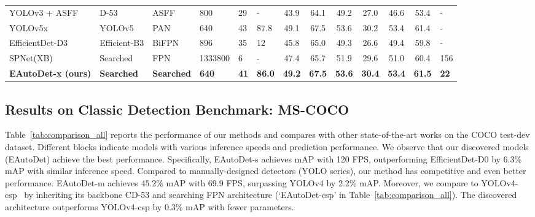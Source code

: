 \documentclass[letterpaper]{article} \usepackage{aaai22}  \usepackage{times}  \usepackage{helvet}  \usepackage{courier}  \usepackage[hyphens]{url}  \usepackage{graphicx} \urlstyle{rm} \def\UrlFont{\rm}  \usepackage{natbib}  \usepackage{caption} \DeclareCaptionStyle{ruled}{labelfont=normalfont,labelsep=colon,strut=off} \frenchspacing  \setlength{\pdfpagewidth}{8.5in}  \setlength{\pdfpageheight}{11in}
\begin{document}
\begin{table*}[tb!]
{\begin{tabular}{llllll c c c c c c l}
\midrule
YOLOv3 + ASFF~\citeyearpar{liu2019learning}  & D-53  & ASFF    & 800 & 29 & - & 43.9 & 64.1 & 49.2 & 27.0 & 46.6 & 53.4 &- \\
YOLOv5x~\citeyearpar{yolov5}         &   YOLOv5         & PAN          & 640 & 43 & 87.8 & 49.1 & 67.5 &    53.6  &  30.2     & 53.4      &  61.4 &- \\
EfficientDet-D3~\citeyearpar{tan2020efficientdet} & Efficient-B3  & BiFPN  & 896 & 35 & 12 & 45.8 & 65.0 & 49.3 & 26.6 & 49.4 & 59.8 &- \\
SPNet(XB)~\citeyearpar{jiang2020sp}&Searched& FPN &1333800&6 & - &47.4 &65.7 &51.9 &29.6 &51.0 &60.4 & 156 \\
\textbf{EAutoDet-x (ours)}  & \textbf{Searched}  & \textbf{Searched} & \textbf{640}    & \textbf{41} & \textbf{86.0}    &  \textbf{49.2}      &  \textbf{67.5 }     &    \textbf{53.6}    &     \textbf{30.4}   & \textbf{53.4}       &  \textbf{61.5}   & \textbf{22}   \\   







\bottomrule
\end{tabular}
}
\end{table*}

\subsection{Results on Classic Detection Benchmark: MS-COCO}
Table~\ref{tab:comparison_all} reports the performance of our methods and compares with other state-of-the-art works on the COCO test-dev dataset.
Different blocks indicate models with various inference speeds and prediction performance. 
We observe that our discovered models (EAutoDet) achieve the best performance. Specifically, EAutoDet-s achieves  mAP with 120 FPS, outperforming EfficientDet-D0 by 6.3\% mAP with similar inference speed.
Compared to manually-designed detectors (YOLO series), our method has competitive and even better performance.
EAutoDet-m achieves 45.2\% mAP with 69.9 FPS, surpassing YOLOv4 by 2.2\% mAP.
Moreover, we compare to YOLOv4-csp~\cite{wang2021scaled} by inheriting its backbone CD-53 and searching FPN architecture (`EAutoDet-csp' in Table~\ref{tab:comparison_all}). The discovered architecture outperforms YOLOv4-csp by 0.3\% mAP with fewer parameters.
\end{document}
